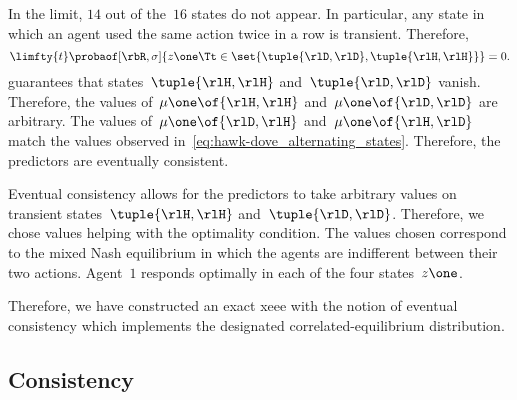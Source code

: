 In the limit, \(14\) out of the~\(16\) states do not appear.
In particular, any state in which an agent used the same action twice in a row is transient.
Therefore,
\begin{equation}
\label{eq:hawk-dove_unseen_states}
\limfty{t} \probaof[\rbR, \sigma]{z\one\Tt \in \set{\tuple{\rlD, \rlD}, \tuple{\rlH, \rlH}}}
= 0.
\end{equation}
 guarantees that states~\(\tuple{\rlH, \rlH}\) and~\(\tuple{\rlD, \rlD}\) vanish.
Therefore, the values of~\(\mu\one \of{\rlH, \rlH}\) and~\(\mu\one \of{\rlD, \rlD}\) are arbitrary.
The values of~\(\mu\one \of{\rlD, \rlH}\) and~\(\mu\one \of{\rlH, \rlD}\) match the values observed in~\cref{eq:hawk-dove_alternating_states}.
Therefore, the predictors are eventually consistent.

Eventual consistency allows for the predictors to take arbitrary values on transient states~\(\tuple{\rlH,\rlH}\) and~\(\tuple{\rlD,\rlD}\).
Therefore, we chose values helping with the optimality condition.
The values chosen correspond to the mixed Nash equilibrium in which the agents are indifferent between their two actions.
Agent~\(1\) responds optimally in each of the four states~\(z\one\).

Therefore, we have constructed an exact \ac{xeee} with the notion of eventual consistency which implements the designated correlated-equilibrium distribution.

\subsection{Consistency}

